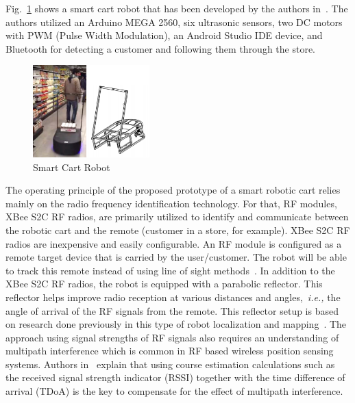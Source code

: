 \documentclass[conference]{IEEEtran}
\begin{document}
%
Fig.~\ref{fig:SmartCart} shows a smart cart robot that has been developed by the authors in~\cite{Rawashdeh2017-Person}. The authors utilized an Arduino MEGA 2560, six
ultrasonic sensors, two DC motors with PWM (Pulse Width Modulation), an Android
Studio IDE device, and Bluetooth for detecting a customer and following them
through the store. %
%
\begin{figure}[htpb]
   \centering
   \includegraphics[width=0.40\textwidth]{figs/img/SmartCart}
   \caption{Smart Cart Robot}
   \label{fig:SmartCart}
\end{figure}
%
The operating principle of the proposed prototype of a smart robotic cart relies mainly on the radio frequency identification technology. For that, RF modules, XBee S2C RF radios, are primarily utilized to identify and communicate between the robotic cart and the remote (customer in a store, for example). XBee S2C RF radios are inexpensive and easily configurable. An RF module is configured as a remote target device that is carried
by the user/customer. The robot will be able to track this remote instead of using line
of sight methods~\cite{Miah2018-Intelligent}. In addition to the XBee S2C RF
radios, the robot is equipped with a parabolic reflector. This reflector helps improve radio reception at various distances and angles,~\textit{i.e.,} the angle of arrival of
the RF signals from the remote. This reflector setup is based on research done previously in this type of robot localization and mapping~\cite{Miah2018-Intelligent,Li2013ANA}. The approach using signal strengths of RF signals also requires an understanding
of multipath interference which is common in RF based wireless position
sensing systems. Authors in~\cite{xie_jiang_zhao_zhang_2019} explain that using
course estimation calculations such as the received signal strength indicator (RSSI) together with the time difference of arrival (TDoA) is the key to compensate for the effect of multipath interference. 
\end{document}
